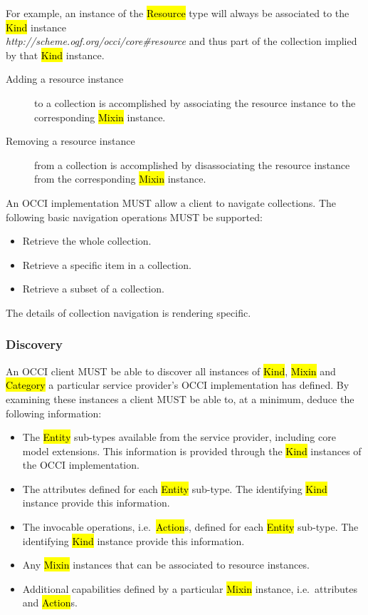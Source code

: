 \documentclass[10pt,a4paper]{article}
\begin{document}
For example, an instance of the \hl{Resource} type will always be
associated to the \hl{Kind} instance 
\\
\textit{http://scheme.ogf.org/occi/core\#resource} and thus part of
the collection implied by that \hl{Kind} instance.

\begin{description}
  \item[Adding a resource instance] to a collection is accomplished by
    associating the resource instance to the corresponding \hl{Mixin}
    instance.
  \item[Removing a resource instance] from a collection is
    accomplished by disassociating the resource instance from the
    corresponding \hl{Mixin} instance.
\end{description}

An OCCI implementation MUST allow a client to navigate
collections. The following basic navigation operations MUST be
supported:

\begin{itemize}
  \item Retrieve the whole collection.
  \item Retrieve a specific item in a collection.
  \item Retrieve a subset of a collection.
\end{itemize}

The details of collection navigation is rendering specific.

\subsubsection{Discovery}
\label{sec:discovery}
An OCCI client MUST be able to discover all instances of \hl{Kind},
\hl{Mixin} and \hl{Category} a particular service provider's OCCI
implementation has defined. By examining these instances a client MUST
be able to, at a minimum, deduce the following information:

\begin{itemize}
  \item The \hl{Entity} sub-types available from the service provider,
    including core model extensions. This information is provided
    through the \hl{Kind} instances of the OCCI implementation.
  \item The attributes defined for each \hl{Entity} sub-type. The
    identifying \hl{Kind} instance provide this information.
  \item The invocable operations, i.e.~\hl{Action}s, defined for each
    \hl{Entity} sub-type. The identifying \hl{Kind} instance provide
    this information.
  \item Any \hl{Mixin} instances that can be associated to resource
    instances.
  \item Additional capabilities defined by a particular \hl{Mixin}
    instance, i.e.~attributes and \hl{Action}s.
\end{itemize}
\end{document}
